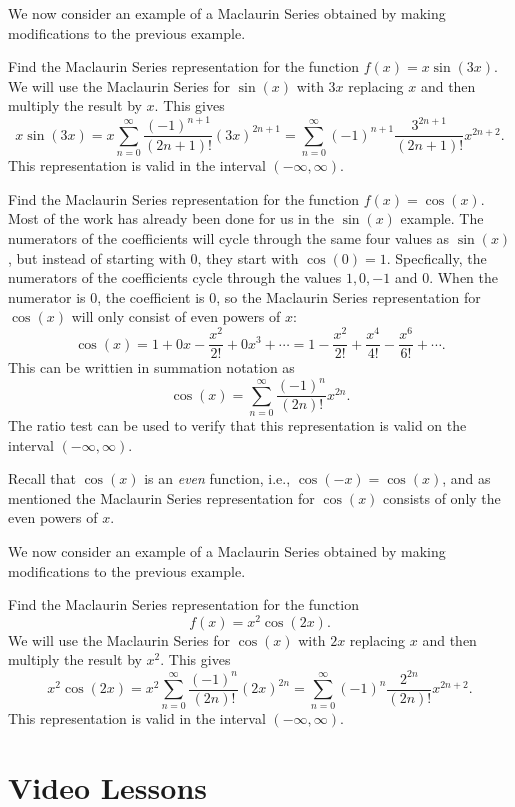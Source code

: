 \documentclass{ximera}
\begin{document}
We now consider an example of a Maclaurin Series obtained by making modifications to the previous example.


\begin{example}[example 5]
Find the Maclaurin Series representation for the function $f(x) = x\sin(3x)$.\\
We will use the Maclaurin Series for $\sin(x)$ with $3x$ replacing $x$ and then multiply the result by $x$.
This gives
\[
x\sin(3x) = x \sum_{n=0}^\infty \frac{(-1)^{n+1}}{(2n+1)!}(3x)^{2n+1} = \sum_{n=0}^\infty (-1)^{n+1} \frac{3^{2n+1}}{(2n+1)!}x^{2n+2}.
\]
This representation is valid in the interval $(-\infty, \infty)$.
\end{example}


\begin{example} 
Find the Maclaurin Series representation for the function $f(x) = \cos(x)$.\\
Most of the work has already been done for us in the $\sin(x)$ example.  The numerators of the coefficients will cycle through the same
four values as $\sin(x)$, but instead of starting with 0, they start with $\cos(0) = 1$. 
Specfically, the numerators of the coefficients cycle through the values $1, 0, -1$ and $0$.  When the numerator is 0, the coefficient is 0,
so the Maclaurin Series representation for $\cos(x)$ will only consist of even powers of $x$:
\[
\cos(x) = 1 + 0x - \frac{x^2}{2!} + 0x^3 + \cdots = 1 - \frac{x^2}{2!} + \frac{x^4}{4!} - \frac{x^6}{6!} + \cdots.
\]
This can be writtien in summation notation as
\[
\cos(x) = \sum_{n=0}^\infty \frac{(-1)^n}{(2n)!}x^{2n}.
\]
The ratio test can be used to verify that this representation is valid on the interval $(-\infty, \infty)$.
\begin{remark}
Recall that $\cos(x)$ is an \textit{even} function, 
i.e., $\cos(-x) = \cos(x)$, and as mentioned the Maclaurin Series representation for $\cos(x)$ consists of only the 
even powers of $x$.
\end{remark} 
\end{example}


We now consider an example of a Maclaurin Series obtained by making modifications to the previous example.

\begin{example}[example 7]
Find the Maclaurin Series representation for the function 
\[
f(x) = x^2\cos(2x).
\]
We will use the Maclaurin Series for $\cos(x)$ with $2x$ replacing $x$ and then multiply the result by $x^2$.
This gives
\[
x^2\cos(2x) = x^2\sum_{n=0}^\infty \frac{(-1)^n}{(2n)!}(2x)^{2n} = \sum_{n=0}^\infty (-1)^n\frac{2^{2n}}{(2n)!}x^{2n+2}.
\]
This representation is valid in the interval $(-\infty, \infty)$.
\end{example}


\section{Video Lessons}


\begin{center}
\begin{foldable}
\end{foldable}
\end{center}
\end{document}
